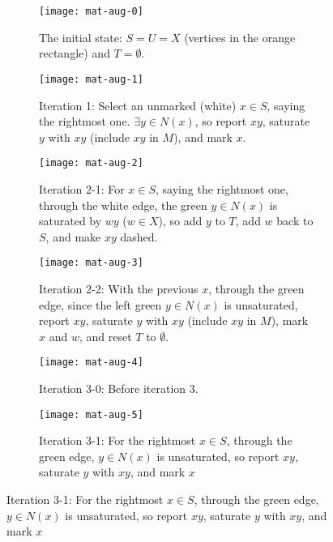 \documentclass[../src/handouts/main.tex]{subfiles}
\begin{document}
\begin{figure}[htbp]
  \def\width{.3\textwidth}%
  \def\gap{\hspace{.04\textwidth}}%
  \centering
  \begin{subfigure}[t]{\width}
    \centering
    \texttt{[image: mat-aug-0]}
    \caption{The initial state: $S = U = X$ (vertices in the orange rectangle) and $T = \emptyset$.}
    \label{fig:mat-aug-0}
  \end{subfigure}
  \gap
  \begin{subfigure}[t]{\width}
    \centering
    \texttt{[image: mat-aug-1]}
    \caption{Iteration 1: Select an unmarked (white) $x \in S$, saying the rightmost one. $\exists y \in N(x)$, so report $xy$, saturate $y$ with $xy$ (include $xy$ in $M$), and mark $x$.}
    \label{fig:mat-aug-1}
  \end{subfigure}
  \gap
  \begin{subfigure}[t]{\width}
    \centering
    \texttt{[image: mat-aug-2]}
    \caption{Iteration 2-1: For $x \in S$, saying the rightmost one, through the white edge, the green $y \in N(x)$ is saturated by $wy$ ($w \in X$), so add $y$ to $T$, add $w$ back to $S$, and make $xy$ dashed.}
    \label{fig:mat-aug-2-1}
  \end{subfigure}

  \begin{subfigure}[t]{\width}
    \centering
    \texttt{[image: mat-aug-3]}
    \caption{Iteration 2-2: With the previous $x$, through the green edge, since the left green $y \in N(x)$ is unsaturated, report $xy$, saturate $y$ with $xy$ (include $xy$ in $M$), mark $x$ and $w$, and reset $T$ to $\emptyset$.}
    \label{fig:mat-aug-2-2}
  \end{subfigure}
  \gap
  \begin{subfigure}[t]{\width}
    \centering
    \texttt{[image: mat-aug-4]}
    \caption{Iteration 3-0: Before iteration 3.}
    \label{fig:mat-aug-3-0}
  \end{subfigure}
  \gap
  \begin{subfigure}[t]{\width}
    \centering
    \texttt{[image: mat-aug-5]}
    \caption{Iteration 3-1: For the rightmost $x \in S$, through the green edge, $y \in N(x)$ is unsaturated, so report $xy$, saturate $y$ with $xy$, and mark $x$}
    \label{fig:mat-aug-3-1}
  \end{subfigure}


\end{figure}
\end{document}
